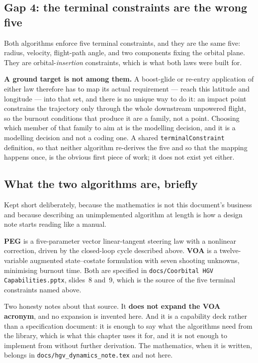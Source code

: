 \documentclass[11pt]{article}
\newcommand{\code}[1]{\texttt{#1}}
\begin{document}
\subsection{Gap 4: the terminal constraints are the wrong five}

Both algorithms enforce five terminal constraints, and they are the same five:
radius, velocity, flight-path angle, and two components fixing the orbital
plane. They are orbital-\emph{insertion} constraints, which is what both laws
were built for.

\textbf{A ground target is not among them.} A boost-glide or re-entry
application of either law therefore has to map its actual requirement --- reach
this latitude and longitude --- into that set, and there is no unique way to do
it: an impact point constrains the trajectory only through the whole
downstream unpowered flight, so the burnout conditions that produce it are a
family, not a point. Choosing which member of that family to aim at is the
modelling decision, and it is a modelling decision and not a coding one. A
shared \code{terminalConstraint} definition, so that neither algorithm
re-derives the five and so that the mapping happens once, is the obvious first
piece of work; it does not exist yet either.

\subsection{What the two algorithms are, briefly}

Kept short deliberately, because the mathematics is not this document's
business and because describing an unimplemented algorithm at length is how a
design note starts reading like a manual.

\textbf{PEG} is a five-parameter vector linear-tangent steering law with a
nonlinear correction, driven by the closed-loop cycle described above.
\textbf{VOA} is a twelve-variable augmented state--costate formulation with
seven shooting unknowns, minimising burnout time. Both are specified in
\code{docs/Coorbital HGV Capabilities.pptx}, slides~8 and~9, which is the
source of the five terminal constraints named above.

Two honesty notes about that source. It \textbf{does not expand the VOA
acronym}, and no expansion is invented here. And it is a capability deck rather
than a specification document: it is enough to say what the algorithms need
from the library, which is what this chapter uses it for, and it is not enough
to implement from without further derivation. The mathematics, when it is
written, belongs in \code{docs/hgv\_dynamics\_note.tex} and not here.
\end{document}
